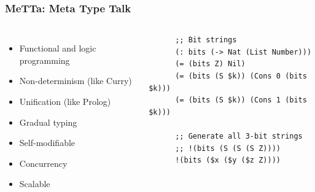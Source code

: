 \documentclass[aspectratio=169]{beamer}
\begin{document}
\begin{frame}[fragile]

  \frametitle{MeTTa: Meta Type Talk}

  \begin{columns}

    \column{7cm}
    \begin{itemize}
    \item Functional and logic programming
    \item Non-determinism (like Curry)
    \item Unification (like Prolog)
    \item Gradual typing
    \item Self-modifiable
    \item Concurrency
    \item Scalable
    \end{itemize}

    \column{7cm}

    \begin{lstlisting}
      ;; Bit strings
      (: bits (-> Nat (List Number)))
      (= (bits Z) Nil)
      (= (bits (S $k)) (Cons 0 (bits $k)))
      (= (bits (S $k)) (Cons 1 (bits $k)))

      ;; Generate all 3-bit strings
      ;; !(bits (S (S (S Z))))
      !(bits ($x ($y ($z Z))))
    \end{lstlisting}


\end{columns}
\end{frame}
\end{document}
